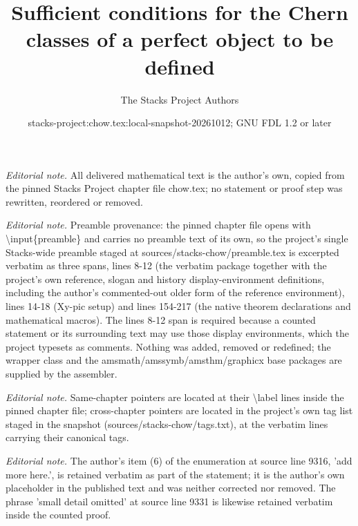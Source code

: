 \documentclass[10pt,a4paper]{amsart}
\title{Sufficient conditions for the Chern classes of a perfect object to be defined}
\author{The Stacks Project Authors}
\date{stacks-project:chow.tex:local-snapshot-20261012; GNU FDL 1.2 or later}
\theoremstyle{plain}
\theoremstyle{definition}
\theoremstyle{remark}
\numberwithin{equation}{subsection}
\begin{document}
\maketitle
\noindent\textit{Editorial note.} All delivered mathematical text is the author's own, copied from the pinned Stacks Project chapter file chow.tex; no statement or proof step was rewritten, reordered or removed.\par\medskip
\noindent\textit{Editorial note.} Preamble provenance: the pinned chapter file opens with \textbackslash{}input\{preamble\} and carries no preamble text of its own, so the project's single Stacks-wide preamble staged at sources/stacks-chow/preamble.tex is excerpted verbatim as three spans, lines 8-12 (the verbatim package together with the project's own reference, slogan and history display-environment definitions, including the author's commented-out older form of the reference environment), lines 14-18 (Xy-pic setup) and lines 154-217 (the native theorem declarations and mathematical macros). The lines 8-12 span is required because a counted statement or its surrounding text may use those display environments, which the project typesets as comments. Nothing was added, removed or redefined; the wrapper class and the amsmath/amssymb/amsthm/graphicx base packages are supplied by the assembler.\par\medskip
\noindent\textit{Editorial note.} Same-chapter pointers are located at their \textbackslash{}label lines inside the pinned chapter file; cross-chapter pointers are located in the project's own tag list staged in the snapshot (sources/stacks-chow/tags.txt), at the verbatim lines carrying their canonical tags.\par\medskip
\noindent\textit{Editorial note.} The author's item (6) of the enumeration at source line 9316, 'add more here.', is retained verbatim as part of the statement; it is the author's own placeholder in the published text and was neither corrected nor removed. The phrase 'small detail omitted' at source line 9331 is likewise retained verbatim inside the counted proof.\par\medskip
\end{document}
